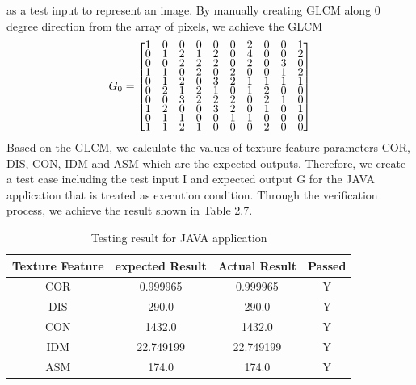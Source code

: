 as a test input to represent an image. By manually creating GLCM along 0 degree direction from the array of pixels, we achieve the GLCM
\begin{align*}
G_0 = 
\renewcommand{\arraystretch}{0.5}
\begin{bmatrix}
    1&     0&     0&     0&     0&     0&      2&     0&     0&     1\\
    0&     1&     2&     1&     2&     0&     4&     0&     0&     2\\
    0&     0&     2&     2&     2&     0&     2&     0&     3  &   0\\
    1&     1&     0&     2&     0&     2&     0&     0&     1 &    2\\
    0&     1&     2&     0&     3&     2&     1&     1 &    1  &   1\\
    0 &    2  &   1  &   2   &  1  &   0  &   1 &    2&     0  &   0\\
    0&     0&     3&     2&     2&     2&     0&     2&     1  &   0\\
    1&     2&     0&     0&     3&     2&     0&     1 &    0  &   1\\
    0 &    1  &   1   &  0   &  0  &   1 &    1&     0&     0  &   0\\
    1&     1&     2&     1&     0&     0&     0&     2&     0  &   0
\end{bmatrix}
\end{align*}
Based on the GLCM, we calculate the values of texture feature parameters COR, DIS, CON, IDM and ASM which are the expected outputs. Therefore, we create a test case including the test input I and expected output G for the JAVA application that is treated as execution condition. Through the verification process, we achieve the result shown in Table 2.7. 
\begin{table}[!h]
\begin{center}
\begin{tabular}{|| c | c  c | c ||}
\hline
Texture Feature & expected Result & Actual Result & Passed \\
\hline\hline
COR & 0.999965 & 0.999965 & Y \\
DIS & 290.0 & 290.0 & Y \\
CON & 1432.0 & 1432.0 & Y \\
IDM & 22.749199 & 22.749199 & Y\\
ASM & 174.0 & 174.0 & Y\\
\hline
\end{tabular}
\end{center}
\caption{Testing result for JAVA application}
\end{table}
